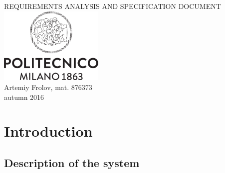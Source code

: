 \documentclass[12pt, letterpaper]{article}
\begin{document}
\begin{titlepage}
\centering
{\Huge REQUIREMENTS ANALYSIS AND SPECIFICATION DOCUMENT} \\
\vspace{1cm}
\includegraphics[width=5cm]{Logo_Politecnico_Milano.png} \\
\vspace{1cm}
Artemiy Frolov, mat. 876373 \\
\vspace{0.5cm}
autumn 2016
\end{titlepage}


\tableofcontents{}

\newpage

\section{Introduction}
\subsection{Description of the system} \\
\end{document}
